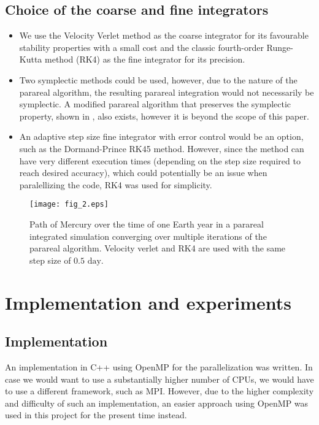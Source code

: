 \documentclass[conference]{IEEEtran}
\begin{document}
\subsection{Choice of the coarse and fine integrators}
\begin{itemize}
    \item We use the Velocity Verlet method as the coarse integrator for its favourable stability properties with a small cost and the classic fourth-order Runge-Kutta method (RK4) as the fine integrator for its precision. 
    \item Two symplectic methods could be used, however, due to the nature of the parareal algorithm, the resulting parareal integration would not necessarily be symplectic. A modified parareal algorithm that preserves the symplectic property, shown in \cite{symplecticparareal}, also exists, however it is beyond the scope of this paper.
    \item An adaptive step size fine integrator with error control would be an option, such as the Dormand-Prince RK45 method. However, since the method can have very different execution times (depending on the step size required to reach desired accuracy), which could potentially be an issue when paralellizing the code, RK4 was used for simplicity.
\end{itemize}

\begin{figure}[htbp]
\centerline{\texttt{[image: fig\_2.eps]}}
\caption{Path of Mercury over the time of one Earth year in a parareal integrated simulation converging over multiple iterations of the parareal algorithm. Velocity verlet and RK4 are used with the same step size of $0.5\text{ day}$.}
\label{mercury}
\end{figure}

\section{Implementation and experiments}

\subsection{Implementation}
An implementation in C++ using OpenMP for the parallelization was written. In case we would want to use a substantially higher number of CPUs, we would have to use a different framework, such as MPI. However, due to the higher complexity and difficulty of such an implementation, an easier approach using OpenMP was used in this project for the present time instead.
\end{document}
